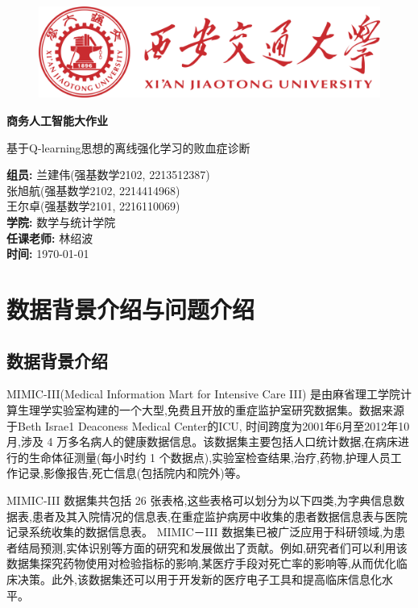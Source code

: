 \documentclass[12pt,a4paper]{ctexart}
\theoremstyle{definition}
\begin{document}
\thispagestyle{empty}

\begin{figure}
    \includegraphics[scale=0.5]{xjtu.png}
    \centering
\end{figure}
\begin{center}
    \Huge
    \textbf{商务人工智能大作业}
\end{center}
\begin{center}
    \Large
    基于Q-learning思想的离线强化学习的败血症诊断
\end{center}
\vskip 7cm 

\begin{flushleft}
\Large
\textbf{组员:}
兰建伟(强基数学2102, 2213512387) \\ 
张旭航(强基数学2102, 2214414968) \\ 
王尔卓(强基数学2101, 2216110069) \\ 
\textbf{学院:} 数学与统计学院   \\ 
\textbf{任课老师:} 林绍波       \\ 
\textbf{时间:} \today          \\
\end{flushleft}


\newpage
\section{数据背景介绍与问题介绍}
\subsection{数据背景介绍}
MIMIC-III(Medical Information Mart for Intensive Care III)
是由麻省理工学院计算生理学实验室构建的一个大型,免费且开放的重症监护室研究数据集。数据来源于Beth Israe1 Deaconess Medical Center的ICU,
时间跨度为2001年6月至2012年10月,涉及 4 万多名病人的健康数据信息。该数据集主要包括人口统计数据,在病床进行的生命体征测量(每小时约 1 个数据点),实验室检查结果,治疗,药物,护理人员工作记录,影像报告,死亡信息(包括院内和院外)等。

MIMIC-III 
数据集共包括 26 张表格,这些表格可以划分为以下四类,为字典信息数据表,患者及其入院情况的信息表,在重症监护病房中收集的患者数据信息表与医院记录系统收集的数据信息表。
MIMIC－III 数据集已被广泛应用于科研领域,为患者结局预测,实体识别等方面的研究和发展做出了贡献。例如,研究者们可以利用该数据集探究药物使用对检验指标的影响,某医疗手段对死亡率的影响等,从而优化临床决策。此外,该数据集还可以用于开发新的医疗电子工具和提高临床信息化水平。
\end{document}

